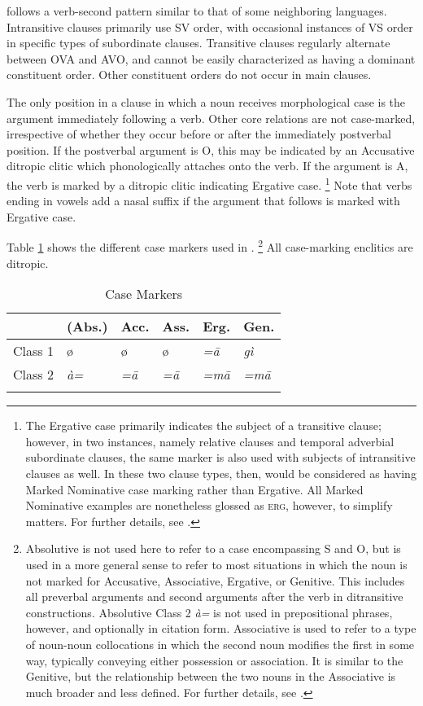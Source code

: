 \documentclass[output=collectionpaper,hidelinks]{langscibook}
\theoremstyle{remark}
\begin{document}
 follows a verb-second pattern similar to that of some neighboring 
languages. Intransitive clauses primarily use SV order, with occasional
instances of VS order in specific types of subordinate clauses. Transitive
clauses regularly alternate between OVA and AVO, and cannot be easily
characterized as having a dominant constituent order. Other constituent orders
do not occur in main clauses.

The only position in a clause in which a noun receives morphological case is the
argument immediately following a verb. Other core relations are not
case-marked, irrespective of whether they occur before or after the immediately
postverbal position. If the postverbal argument is O, this may be indicated
by an Accusative ditropic clitic which phonologically attaches onto the verb.
If the argument is A, the verb is marked by a ditropic clitic indicating Ergative
case.%
\footnote{The Ergative case primarily indicates the subject of a transitive
clause; however, in two instances, namely relative clauses and temporal
adverbial subordinate clauses, the same marker is also used with subjects of
intransitive clauses as well. In these two clause types, then,  would be
considered as having Marked Nominative case marking rather than Ergative. All
Marked Nominative examples are nonetheless glossed as \textsc{erg}, however, to
simplify matters. For further details, see \citet{Killian2015}.} %
Note
that verbs ending in vowels add a nasal suffix if the argument that follows is
marked with Ergative case.

Table \ref{tab:Don:case_markers} shows the different case markers used in
.%
\footnote{Absolutive is not used here to refer to a case encompassing S and O,
but is used in a more general sense to refer to most situations in which the
noun is not marked for Accusative, Associative, Ergative, or Genitive.  This
includes all preverbal arguments and second arguments after the verb in
ditransitive constructions.  Absolutive Class 2 \emph{à=} is not used in
prepositional phrases, however, and optionally in citation form.  Associative is
used to refer to a type of noun-noun collocations in which the second noun
modifies the first in some way, typically conveying either possession or
association.  It is similar to the Genitive, but the relationship between the
two nouns in the Associative is much broader and less defined.  For further
details, see \citet{Killian2015}.} %
All case-marking enclitics are ditropic.

\begin{table}[h!]
\centering
\caption{Case Markers}
\label{tab:Don:case_markers}
\begin{tabularx}{.7\textwidth}{lXXXXX}
\lsptoprule
& (Abs.) & Acc. & Ass. & Erg. & Gen. \\
\midrule
Class 1 & ø & ø & ø & \itshape  =ā & \itshape  gì \\
Class 2 &  \itshape à= & \itshape  =ā &  \itshape =ā &  \itshape =mā & \itshape  =mā \\
\lspbottomrule
\end{tabularx}
\end{table}
\end{document}
